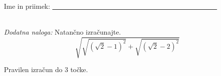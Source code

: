 \documentclass[addpoints]{exam}
\begin{document}
\begin{questions}
    






     \newpage

     \noindent Ime in priimek: \underline{~~~~~~~~~~~~~~~~~~~~~~~~~~~~~~~~~~~~~~~~~~~~~~~~}

     ~\\






        

    \bonusquestion[3]
    \textit{Dodatna naloga:} Natančno izračunajte. $$ \sqrt{\sqrt{\left(\sqrt{2}-1\right)^2}+\sqrt{\left(\sqrt{2}-2\right)^2}} $$

    \begin{solution}[7cm]
        Pravilen izračun do $3$ točke.
    \end{solution}




\end{questions}
\end{document}
